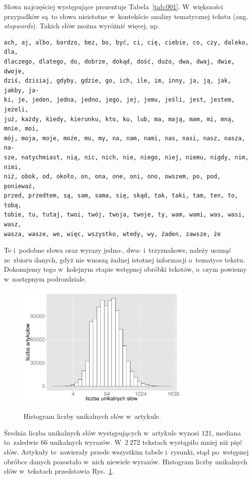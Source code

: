 \documentclass{praca1}
\begin{document}
Słowa najczęściej występujące prezentuje Tabela~\ref{tab:001}. W~większości przypadków są~to słowa nieistotne w~kontekście analizy tematycznej tekstu (ang. \emph{stopwords}). Takich słów można wyróżnić więcej, np.
\begin{verbatim}
ach, aj, albo, bardzo, bez, bo, być, ci, cię, ciebie, co, czy, daleko, dla,
dlaczego, dlatego, do, dobrze, dokąd, dość, dużo, dwa, dwaj, dwie, dwoje, 
dziś, dzisiaj, gdyby, gdzie, go, ich, ile, im, inny, ja, ją, jak, jakby, ja-
ki, je, jeden, jedna, jedno, jego, jej, jemu, jeśli, jest, jestem, jeżeli, 
już, każdy, kiedy, kierunku, kto, ku, lub, ma, mają, mam, mi, mną, mnie, moi,
mój, moja, moje, może, mu, my, na, nam, nami, nas, nasi, nasz, nasza, na-
sze, natychmiast, nią, nic, nich, nie, niego, niej, niemu, nigdy, nim, nimi,
niż, obok, od, około, on, ona, one, oni, ono, owszem, po, pod, ponieważ, 
przed, przedtem, są, sam, sama, się, skąd, tak, taki, tam, ten, to, tobą, 
tobie, tu, tutaj, twoi, twój, twoja, twoje, ty, wam, wami, was, wasi, wasz, 
wasza, wasze, we, więc, wszystko, wtedy, wy, żaden, zawsze, że
\end{verbatim}

Te i~podobne słowa oraz wyrazy jedno-, dwu- i~trzyznakowe, należy usunąć ze~zbioru danych, gdyż nie wnoszą żadnej istotnej informacji o~tematyce tekstu. Dokonujemy tego w~kolejnym etapie wstępnej obróbki tekstów, o~czym powiemy w~następnym podrozdziale.

\begin{figure}[!h]
  \centering
  \includegraphics[width=240pt]{plot4.pdf}\\
  \caption{Histogram liczby unikalnych słów w~artykule.}\label{plot:004}
\end{figure}


Średnia liczba unikalnych słów występujących w~artykule wynosi $121$, mediana to~zaledwie $66$ unikalnych wyrazów. W~$2\ 272$ tekstach wystąpiło mniej niż pięć słów. Artykuły te~zawierały przede wszystkim tabele i~rysunki, stąd po~wstępnej obróbce danych pozostało w~nich niewiele wyrazów. Histogram liczby unikalnych słów w~tekstach przedstawia Rys.~\ref{plot:004}.
\end{document}
